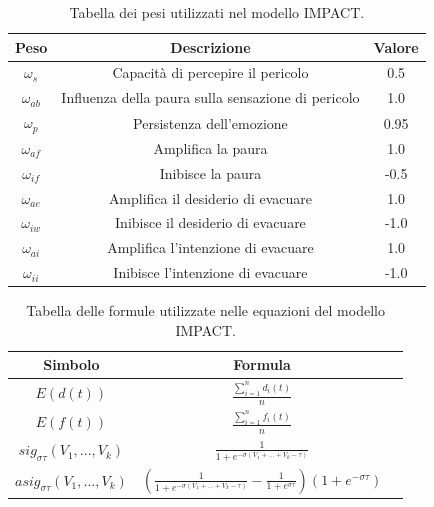 \begin{table}[ht]
\centering
\renewcommand{\arraystretch}{1.5}
\begin{tabular}{|c|c|c|}
\hline
\textbf{Peso}       & \textbf{Descrizione}                                  & \textbf{Valore}   \\ \hline
$\omega_{s}$        & Capacità di percepire il pericolo                     & 0.5               \\ \hline
$\omega_{ab}$       & Influenza della paura sulla sensazione di pericolo    & 1.0               \\ \hline
$\omega_{p}$        & Persistenza dell'emozione                             & 0.95              \\ \hline
$\omega_{af}$       & Amplifica la paura                                    & 1.0               \\ \hline
$\omega_{if}$       & Inibisce la paura                                     & -0.5              \\ \hline
$\omega_{ae}$       & Amplifica il desiderio di evacuare                    & 1.0               \\ \hline
$\omega_{iw}$       & Inibisce il desiderio di evacuare                     & -1.0              \\ \hline
$\omega_{ai}$       & Amplifica l'intenzione di evacuare                    & 1.0               \\ \hline
$\omega_{ii}$       & Inibisce l'intenzione di evacuare                     & -1.0              \\ \hline
\end{tabular}
\caption{Tabella dei pesi utilizzati nel modello IMPACT.}
\label{table:weights-impact}
\end{table}

\begin{table}[ht]
\centering
\renewcommand{\arraystretch}{1.5}
\begin{tabular}{|c|c|c|}
\hline
\textbf{Simbolo}                                & \textbf{Formula}                                                  \\ \hline
$E(d(t))$                                       & $\frac{\sum_{i=1}^{n} d_{i}(t)}{n}$                               \\ \hline
$E(f(t))$                                       & $\frac{\sum_{i=1}^{n} f_{i}(t)}{n}$                               \\ \hline
$sig_{\sigma \tau}(V_{1}, ..., V_{k})$          & $\frac{1}{1 + e^{-\sigma(V_{1} + ... + V_{k} - \tau)}}$           \\ \hline
$asig_{\sigma \tau}(V_{1}, ..., V_{k})$         & $(\frac{1}{1 + e^{-\sigma(V_{1} + ... + V_{k} - \tau)}} - \frac{1}{1 + e^{\sigma \tau}})(1 + e^{-\sigma \tau})$ \\ \hline
\end{tabular}
\caption{Tabella delle formule utilizzate nelle equazioni del modello IMPACT.}
\label{table:formulas-impact}
\end{table}

